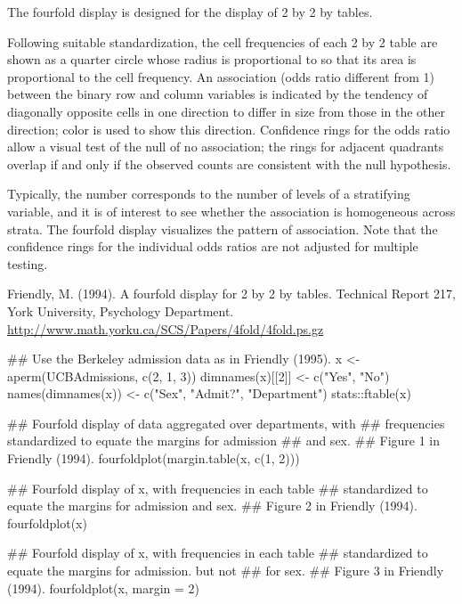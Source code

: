\begin{Details}\relax
The fourfold display is designed for the display of 2 by 2 by 
tables.

Following suitable standardization, the cell frequencies
 of each 2 by 2 table are shown as a quarter
circle whose radius is proportional to
 so that its area is proportional to
the cell frequency.  An association (odds ratio different from 1)
between the binary row and column variables is indicated by the
tendency of diagonally opposite cells in one direction to differ in
size from those in the other direction; color is used to show this
direction.  Confidence rings for the odds ratio allow a visual test of
the null of no association; the rings for adjacent quadrants overlap
if and only if the observed counts are consistent with the null hypothesis.

Typically, the number  corresponds to the number of levels of a
stratifying variable, and it is of interest to see whether the
association is homogeneous across strata.  The fourfold display
visualizes the pattern of association.  Note that the confidence rings
for the individual odds ratios are not adjusted for multiple testing.
\end{Details}
%
\begin{References}\relax
Friendly, M. (1994).
A fourfold display for 2 by 2 by  tables.
Technical Report 217, York University, Psychology Department.
\url{http://www.math.yorku.ca/SCS/Papers/4fold/4fold.ps.gz}
\end{References}
%
\begin{SeeAlso}\relax
{}
\end{SeeAlso}
%
\begin{Examples}
\begin{ExampleCode}
## Use the Berkeley admission data as in Friendly (1995).
x <- aperm(UCBAdmissions, c(2, 1, 3))
dimnames(x)[[2]] <- c("Yes", "No")
names(dimnames(x)) <- c("Sex", "Admit?", "Department")
stats::ftable(x)

## Fourfold display of data aggregated over departments, with
## frequencies standardized to equate the margins for admission
## and sex.
## Figure 1 in Friendly (1994).
fourfoldplot(margin.table(x, c(1, 2)))

## Fourfold display of x, with frequencies in each table
## standardized to equate the margins for admission and sex.
## Figure 2 in Friendly (1994).
fourfoldplot(x)

## Fourfold display of x, with frequencies in each table
## standardized to equate the margins for admission. but not
## for sex.
## Figure 3 in Friendly (1994).
fourfoldplot(x, margin = 2)
\end{ExampleCode}
\end{Examples}
